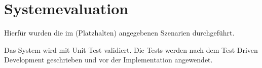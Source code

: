 \section{Systemevaluation}

Hierfür wurden die im (Platzhalten) angegebenen Szenarien durchgeführt. 

Das System wird mit Unit Test validiert. Die Tests werden nach dem Test Driven Development geschrieben und vor der Implementation angewendet.